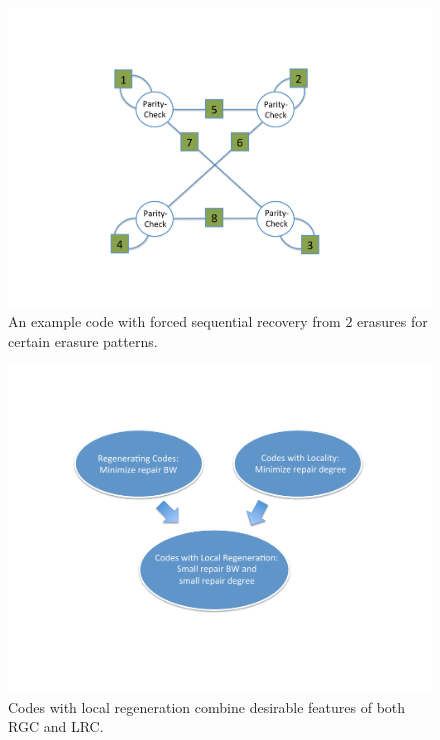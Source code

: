 	\begin{figure}[H]
		\centering
		\includegraphics[scale=.48]{src/Figures/chap4/turan}  
		\caption{An example code with forced sequential recovery from $2$ erasures for certain erasure patterns.}  \label{fig:turan}    
	\end{figure}	 

	\begin{figure}[H]
		\centering
		\includegraphics[scale=.45]{src/Figures/chap4/CLG_idea}  
		\caption{Codes with local regeneration combine desirable features of both RGC and LRC.}  \label{fig:CLG_idea}    
	\end{figure}

